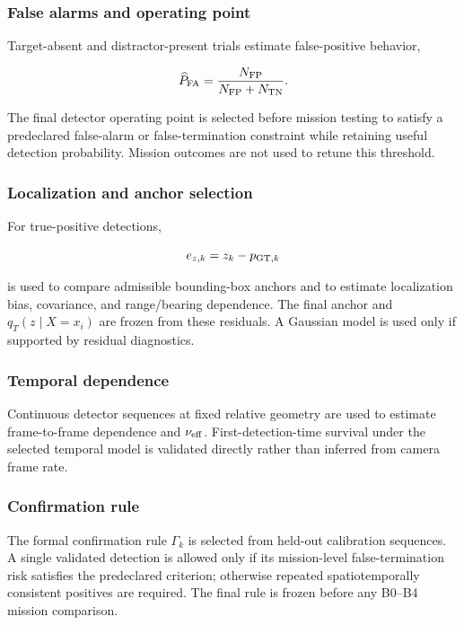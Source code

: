 \documentclass[conference]{IEEEtran}
\begin{document}
\subsubsection{False alarms and operating point}

Target-absent and distractor-present trials estimate false-positive behavior,

\begin{equation}
\widehat P_{\rm FA}=
\frac{N_{\rm FP}}{N_{\rm FP}+N_{\rm TN}}.
\label{eq:empirical_pfa}
\end{equation}

The final detector operating point is selected before mission testing to
satisfy a predeclared false-alarm or false-termination constraint while
retaining useful detection probability. Mission outcomes are not used to
retune this threshold.

\subsubsection{Localization and anchor selection}

For true-positive detections,

\begin{equation}
e_{z,k}=z_k-p_{{\rm GT},k}
\label{eq:localization_error}
\end{equation}

is used to compare admissible bounding-box anchors and to estimate localization
bias, covariance, and range/bearing dependence. The final anchor and
$q_T(z\mid X=x_i)$ are frozen from these residuals. A Gaussian model is used
only if supported by residual diagnostics.

\subsubsection{Temporal dependence}

Continuous detector sequences at fixed relative geometry are used to estimate
frame-to-frame dependence and $\nu_{\rm eff}$. First-detection-time survival
under the selected temporal model is validated directly rather than inferred
from camera frame rate.

\subsubsection{Confirmation rule}

The formal confirmation rule $\Gamma_k$ is selected from held-out calibration
sequences. A single validated detection is allowed only if its mission-level
false-termination risk satisfies the predeclared criterion; otherwise repeated
spatiotemporally consistent positives are required. The final rule is frozen
before any B0--B4 mission comparison.
\end{document}
